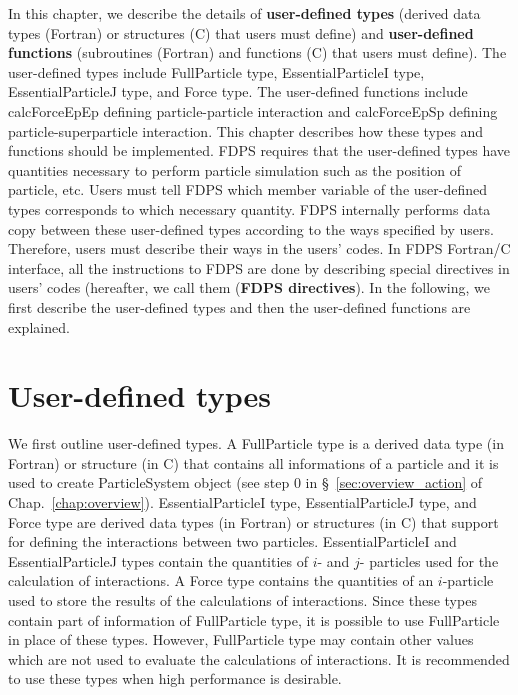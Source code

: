 In this chapter, we describe the details of \textbf{user-defined types} (derived data types (Fortran) or structures (C) that users must define) and \textbf{user-defined functions} (subroutines (Fortran) and functions (C) that users must define). The user-defined types include FullParticle type, EssentialParticleI type, EssentialParticleJ type, and Force type. The user-defined functions include calcForceEpEp defining particle-particle interaction and calcForceEpSp defining particle-superparticle interaction. This chapter describes how these types and functions should be implemented. FDPS requires that the user-defined types have quantities necessary to perform particle simulation such as the position of particle, etc. Users must tell FDPS which member variable of the user-defined types corresponds to which necessary quantity. FDPS internally performs data copy between these user-defined types according to  the ways specified by users. Therefore, users must describe their ways in the users' codes. In FDPS Fortran/C interface, all the instructions to FDPS are done by describing special directives in users' codes (hereafter, we call them (\textbf{FDPS directives}). In the following, we first describe the user-defined types and then the user-defined functions are explained.

\section{User-defined types}
\label{sec:user_defined_types}
We first outline user-defined types. A FullParticle type is a derived data type {\small (in Fortran)} or structure {\small (in C)} that contains all informations of a particle and it is used to create ParticleSystem object (see step 0 in \S~\ref{sec:overview_action} of Chap.~\ref{chap:overview}). EssentialParticleI type, EssentialParticleJ type, and Force type are derived data types {\small (in Fortran)} or structures {\small (in C)} that support for defining the interactions between two particles. EssentialParticleI and EssentialParticleJ types contain the quantities of $i$- and $j$- particles used for the calculation of interactions. A Force type contains the quantities of an $i$-particle used to store the results of the calculations of interactions. Since these types contain part of information of FullParticle type, it is possible to use FullParticle in place of these types. However, FullParticle type may contain other values which are not used to evaluate the calculations of interactions. It is recommended to use these types when high performance is desirable.

